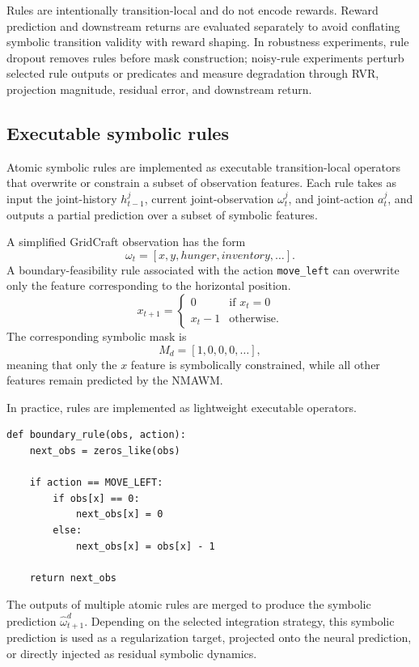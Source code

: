 \documentclass{article}
\theoremstyle{plain}
\theoremstyle{definition}
\theoremstyle{remark}
\begin{document}
Rules are intentionally transition-local and do not encode rewards. Reward prediction and downstream returns are evaluated separately to avoid conflating symbolic transition validity with reward shaping. In robustness experiments, rule dropout removes rules before mask construction; noisy-rule experiments perturb selected rule outputs or predicates and measure degradation through RVR, projection magnitude, residual error, and downstream return.

\subsection{Executable symbolic rules}

Atomic symbolic rules are implemented as executable transition-local operators
that overwrite or constrain a subset of observation features. Each rule
takes as input the joint-history $h^j_{t-1}$, current joint-observation
$\omega^j_t$, and joint-action $a^j_t$, and outputs a partial prediction over
a subset of symbolic features.

A simplified GridCraft observation has the form
\[
  \omega_t = [x,y,hunger,inventory,\dots].
\]
A boundary-feasibility rule associated with the action
\texttt{move\_left} can overwrite only the feature corresponding to the
horizontal position.
\[
  x_{t+1} =
  \begin{cases}
    0       & \text{if } x_t = 0 \\
    x_t - 1 & \text{otherwise}.
  \end{cases}
\]
The corresponding symbolic mask is
\[
  M_d = [1,0,0,0,\dots],
\]
meaning that only the $x$ feature is symbolically constrained, while all
other features remain predicted by the NMAWM.

In practice, rules are implemented as lightweight executable operators.

\begin{verbatim}
def boundary_rule(obs, action):
    next_obs = zeros_like(obs)

    if action == MOVE_LEFT:
        if obs[x] == 0:
            next_obs[x] = 0
        else:
            next_obs[x] = obs[x] - 1

    return next_obs
\end{verbatim}

The outputs of multiple atomic rules are merged to produce the symbolic
prediction $\hat{\omega}^{d}_{t+1}$. Depending on the selected integration
strategy, this symbolic prediction is used as a regularization target, projected onto the neural prediction, or directly injected as residual symbolic dynamics.
\end{document}

